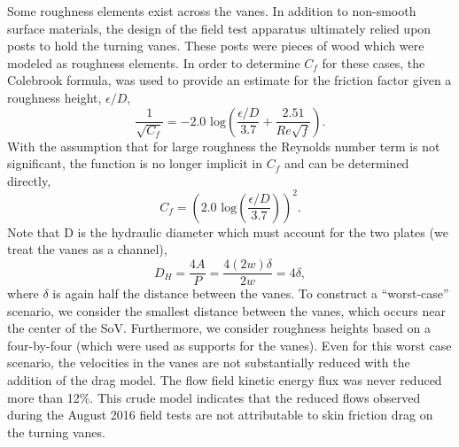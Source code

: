 %
%

Some roughness elements exist across the vanes. In addition to
non-smooth surface materials, the design of the field test apparatus
ultimately relied upon posts to hold the turning vanes. These posts were
pieces of wood which were modeled as roughness elements. In order to
determine $C_f$ for these cases, the Colebrook formula\cite{Colebrook367},
was used to provide an estimate for the friction factor given a
roughness height, $\epsilon/D$,  
\begin{equation}
 \frac{1}{\sqrt{C_f}} = -2.0 \text{ log}\left(\frac{\epsilon/D}{3.7} + \frac{2.51}{Re\sqrt{f}}\right).
\end{equation}
 With the assumption that for large roughness the Reynolds number term
 is not significant, the function is no longer implicit in $C_f$ and can
 be determined directly,  
\begin{equation}
 C_f = \left(2.0 \text{ log}\left(\frac{\epsilon/D}{3.7}\right)\right)^2. 
\end{equation}
Note that D is the hydraulic diameter which must account for the
two plates (we treat the vanes as a channel),
\begin{equation}
D_H = \frac{4 A}{P} = \frac{4 (2w)\delta}{2w} = 4 \delta,
\end{equation}
where $\delta$ is again half the distance between the vanes. 
To construct a ``worst-case'' scenario, we consider
the smallest distance between the vanes, which occurs near the center of
the SoV. Furthermore, we consider roughness heights based on a
four-by-four (which were used as supports for the
vanes). Even for this worst case scenario, the velocities in the vanes
are not substantially reduced with the addition of the drag model. The
flow field kinetic energy flux was never reduced more than 12\%. 
This crude model indicates that the reduced flows observed during the
August 2016 field tests are not attributable to skin friction drag on the
turning vanes.  


